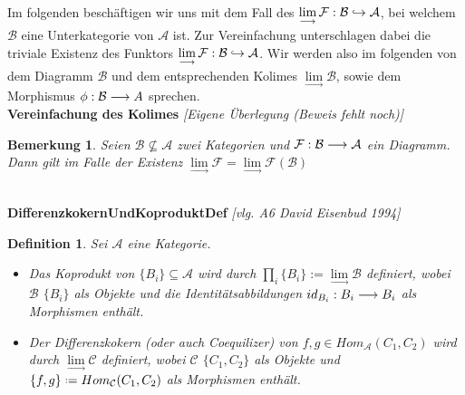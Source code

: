 \documentclass[10pt,a4paper]{report}
\newcommand{\ModulsOfDifferenzials}{David Eisenbud 1994}
\newcounter{Aussage}[chapter]
\newtheorem{bem}[Aussage]{Bemerkung}
\newtheorem{definition}[Aussage]{Definition}
\newcommand{\functionfront}[3]{\nolinebreak{#1:#2 \longrightarrow #3}}
\newcommand{\infunctionfront}[3]{\nolinebreak{#1:#2 \hookrightarrow #3}}
\newcommand{\colimes}[0]{\lim\limits_{ \longrightarrow }}
\newcommand*{\defeq}{\mathrel{\vcenter{\baselineskip0.5ex \lineskiplimit0pt
                     \hbox{\scriptsize.}\hbox{\scriptsize.}}}%
                     =}
\begin{document}
\ \\
Im folgenden beschäftigen wir uns mit dem Fall des $\colimes \infunctionfront{\mathcal{F}}{\mathcal{B}}{\mathcal{A}}$, bei welchem $\mathcal{B}$ eine Unterkategorie von $\mathcal{A}$ ist. Zur Vereinfachung unterschlagen dabei die triviale Existenz des Funktors $\colimes \infunctionfront{\mathcal{F}}{\mathcal{B}}{\mathcal{A}}$. Wir werden also im folgenden von dem Diagramm $\mathcal{B}$ und dem entsprechenden Kolimes $\colimes \mathcal{B}$, sowie dem Morphismus $\functionfront{\phi}{\mathcal{B}}{A} $ sprechen.\\ 
\textbf{Vereinfachung des Kolimes} \textit{[Eigene Überlegung (Beweis fehlt noch)]}
\begin{bem}\label{Vereinfachung des Kolimes}
Seien $\mathcal{B} \nsubseteq \mathcal{A}$ zwei Kategorien und $\functionfront{\mathcal{F}}{\mathcal{B}}{\mathcal{A}}$ ein Diagramm.\\
Dann gilt im Falle der Existenz $\colimes \mathcal{F} = \colimes \mathcal{F}(\mathcal{B})$ 
\end{bem}


\ \\
\textbf{DifferenzkokernUndKoproduktDef} \textit{[vlg. A6 \ModulsOfDifferenzials]}
\begin{definition} \label{DifferenzkokernUndKoproduktDef}
Sei $\mathcal{A}$ eine Kategorie.
\begin{itemize}
\item Das Koprodukt von $ \lbrace B_i \rbrace \subseteq \mathcal{A}$ wird durch $\prod_i \lbrace B_i \rbrace := \colimes\mathcal{B}$ definiert, 
wobei $\mathcal{B}$ $\lbrace B_i \rbrace$ als Objekte und die Identitätsabbildungen $\functionfront{id_{B_i}}{B_i}{B_i}$ als Morphismen enthält.
\item Der Differenzkokern (oder auch Coequilizer) von $f,g \in Hom_{\mathcal{A}}(C_1,C_2)$ wird durch $\colimes \mathcal{C}$ definiert,
wobei $\mathcal{C}$ $\lbrace C_1,C_2 \rbrace$ als Objekte und $ \lbrace f,g \rbrace \defeq Hom_{\mathcal{C}}(C_1,C_2)$ als Morphismen enthält.
\end{itemize}
\end{definition}
\end{document}
